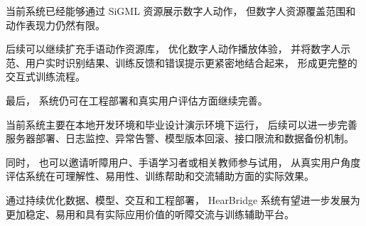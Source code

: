 当前系统已经能够通过 SiGML 资源展示数字人动作，
但数字人资源覆盖范围和动作表现力仍然有限。

后续可以继续扩充手语动作资源库，
优化数字人动作播放体验，
并将数字人示范、用户实时识别结果、训练反馈和错误提示更紧密地结合起来，
形成更完整的交互式训练流程。

最后，
系统仍可在工程部署和真实用户评估方面继续完善。

当前系统主要在本地开发环境和毕业设计演示环境下运行，
后续可以进一步完善服务器部署、日志监控、异常告警、模型版本回滚、接口限流和数据备份机制。

同时，
也可以邀请听障用户、手语学习者或相关教师参与试用，
从真实用户角度评估系统在可理解性、易用性、训练帮助和交流辅助方面的实际效果。

通过持续优化数据、模型、交互和工程部署，
HearBridge 系统有望进一步发展为更加稳定、易用和具有实际应用价值的听障交流与训练辅助平台。